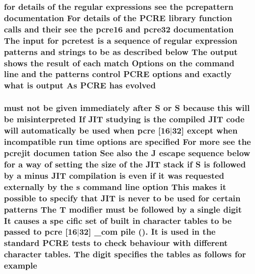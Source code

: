 \subsubsection[{\texorpdfstring{evolved}{evolved}}]{\setlength{\rightskip}{0pt plus 5cm}for {\bf details} {\bf of} the regular {\bf expressions} see the {\bf pcrepattern} {\bf documentation} For {\bf details} {\bf of} the {\bf P\+C\+RE} {\bf library} {\bf function} {\bf calls} and their see the {\bf pcre16} and {\bf pcre32} {\bf documentation} The {\bf input} for {\bf pcretest} {\bf is} {\bf a} {\bf sequence} {\bf of} regular {\bf expression} {\bf patterns} and {\bf strings} {\bf to} {\bf be} {\bf as} described {\bf below} The {\bf output} shows the {\bf result} {\bf of} each {\bf match} Options {\bf on} the {\bf command} {\bf line} and the {\bf patterns} control {\bf P\+C\+RE} {\bf options} and {\bf exactly} {\bf what} {\bf is} {\bf output} As {\bf P\+C\+RE} has evolved}\hypertarget{pcretest_8txt_aa9af1ee9cb6f1725ca82794b1a412221}{}\label{pcretest_8txt_aa9af1ee9cb6f1725ca82794b1a412221}
\subsubsection[{\texorpdfstring{example}{example}}]{ must {\bf not} {\bf be} {\bf given} immediately {\bf after} {\bf S} {\bf or} {\bf S} because {\bf this} will {\bf be} misinterpreted If J\+IT {\bf studying} {\bf is} the {\bf compiled} J\+IT {\bf code} will automatically {\bf be} {\bf used} when {\bf pcre} \mbox{[}16$\vert$32\mbox{]} {\bf except} when incompatible {\bf run} {\bf time} {\bf options} {\bf are} {\bf specified} For more see the pcrejit documen tation See also the {\bf J} escape {\bf sequence} {\bf below} for {\bf a} {\bf way} {\bf of} {\bf setting} the {\bf size} {\bf of} the J\+IT {\bf stack} {\bf if} {\bf S} {\bf is} followed by {\bf a} minus J\+IT {\bf compilation} {\bf is} even {\bf if} {\bf it} was requested externally by the {\bf s} {\bf command} {\bf line} {\bf option} This makes {\bf it} {\bf possible} {\bf to} specify that J\+IT {\bf is} never {\bf to} {\bf be} {\bf used} for certain {\bf patterns} The {\bf T} {\bf modifier} must {\bf be} followed by {\bf a} single digit It causes {\bf a} spe cific {\bf set} {\bf of} {\bf built} {\bf in} {\bf character} {\bf tables} {\bf to} {\bf be} passed {\bf to} {\bf pcre} \mbox{[}16$\vert$32\mbox{]} \+\_\+com pile (). It {\bf is} {\bf used} {\bf in} the standard {\bf P\+C\+RE} {\bf tests} {\bf to} check behaviour {\bf with} different {\bf character} tables. The digit specifies the {\bf tables} {\bf as} {\bf follows} for example}\hypertarget{pcretest_8txt_ac2cc8dc0b2cf1d8e2d04667390da7402}{}\label{pcretest_8txt_ac2cc8dc0b2cf1d8e2d04667390da7402}
